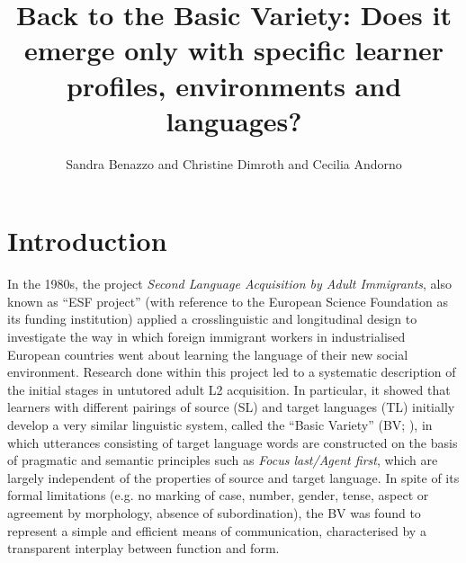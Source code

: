 \documentclass[output=paper]{langscibook}
\author{Sandra Benazzo\orcid{}\affiliation{Université Paris 8} and     Christine Dimroth\orcid{}\affiliation{Universität Münster} and    Cecilia Andorno\orcid{}\affiliation{Università di Torino}}
\title[Back to the Basic Variety]{Back to the Basic Variety: Does it emerge only with specific learner profiles, environments and languages?}
\begin{document}
\maketitle 

\section{Introduction}\label{sec:benazzo:1}

In the 1980s, the project \textit{Second Language Acquisition by Adult Immigrants}, also known as “ESF project” (with reference to the European Science Foundation as its funding institution) applied a crosslinguistic and longitudinal design to investigate the way in which foreign immigrant workers in industrialised European countries went about learning the language of their new social environment. Research done within this project led to a systematic description of the initial stages in untutored adult L2 acquisition. In particular, it showed that learners with different pairings of source (SL) and target languages (TL) initially develop a very similar linguistic system, called the “Basic Variety” (BV; \citealt{KleinPerdue1997}), in which utterances consisting of target language words are constructed on the basis of pragmatic and semantic principles such as \textit{Focus last\slash Agent first}, which are largely independent of the properties of source and target language. In spite of its formal limitations (e.g. no marking of case, number, gender, tense, aspect or agreement by morphology, absence of subordination), the BV was found to represent a simple and efficient means of communication, characterised by a transparent interplay between function and form. 
\end{document}
